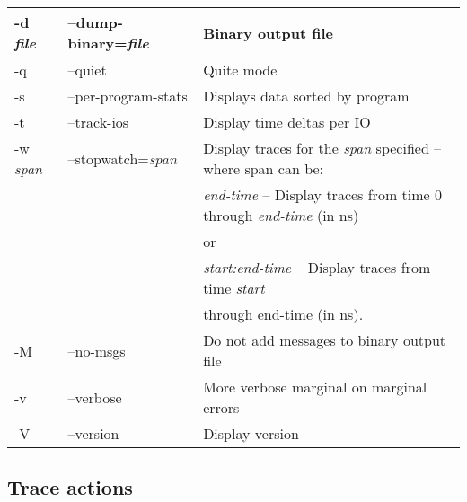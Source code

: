 \documentclass{article}
\begin{document}
\begin{tabular}{|l|l|l|}
-d \emph{file}     & --dump-binary=\emph{file}  & Binary output file \\ \hline

-q                 & --quiet                    & Quite mode \\ \hline

-s                 & --per-program-stats        & Displays data sorted by program \\ \hline

-t                 & --track-ios                & Display time deltas per IO \\ \hline

-w \emph{span}     & --stopwatch=\emph{span}    & Display traces for the \emph{span} specified -- where span can be: \\ 
                   &                            & \emph{end-time} -- Display traces from time 0 through \emph{end-time} (in ns) \\
		   &                            & or \\
		   &                            & \emph{start:end-time} -- Display traces from time \emph{start} \\
		   &                            & through {end-time} (in ns). \\ \hline

-M                 & --no-msgs                  & Do not add messages to binary output file \\\hline
-v                 & --verbose                  & More verbose marginal on marginal errors \\ \hline
-V                 & --version                  & Display version \\ \hline

\end{tabular}

\newpage
\subsection{\label{sec:blkparse-actions}Trace actions}
\end{document}
